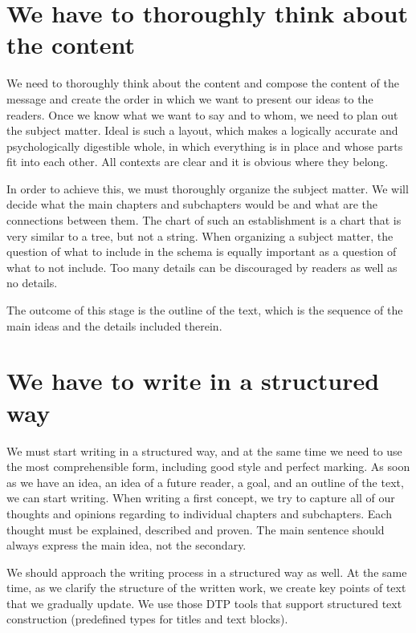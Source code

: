 \documentclass[english,odsaz]{fitthesis}
\begin{document}
\section{We have to thoroughly think about the content}
\label{sec-1-3}
We need to thoroughly think about the content and compose the content of the
message and create the order in which we want to present our ideas to the
readers. Once we know what we want to say and to whom, we need to plan out the
subject matter. Ideal is such a layout, which makes a logically accurate and
psychologically digestible whole, in which everything is in place and whose
parts fit into each other. All contexts are clear and it is obvious where they
belong.

In order to achieve this, we must thoroughly organize the subject matter. We
will decide what the main chapters and subchapters would be and what are the
connections between them. The chart of such an establishment is a chart that is
very similar to a tree, but not a string. When organizing a subject matter, the
question of what to include in the schema is equally important as a question of
what to not include. Too many details can be discouraged by readers as well as
no details.

The outcome of this stage is the outline of the text, which is the sequence of
the main ideas and the details included therein.

\section{We have to write in a structured way}
\label{sec-1-4}
We must start writing in a structured way, and at the same time we need to use
the most comprehensible form, including good style and perfect marking.  As soon
as we have an idea, an idea of a future reader, a goal, and an outline of the
text, we can start writing. When writing a first concept, we try to capture all
of our thoughts and opinions regarding to individual chapters and
subchapters. Each thought must be explained, described and proven. The main
sentence should always express the main idea, not the secondary.

We should approach the writing process in a structured way as well. At the same
time, as we clarify the structure of the written work, we create key points of
text that we gradually update. We use those DTP tools that support structured
text construction (predefined types for titles and text blocks).
\end{document}
